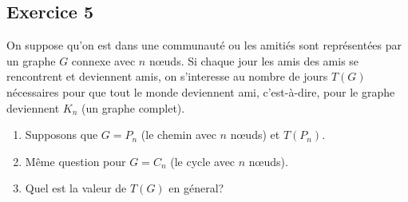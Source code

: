 \subsection*{Exercice 5}
On suppose qu'on est dans une communaut\'{e} ou les amiti\'{e}s sont repr\'{e}sent\'{e}es par un graphe $G$ connexe avec $n$ n\oe{}uds.
Si chaque jour les amis des amis se rencontrent et deviennent amis, on s'interesse au nombre de jours $T(G)$ n\'{e}cessaires
pour que tout le monde deviennent ami, c'est-\`{a}-dire, pour le graphe deviennent $K_n$ (un graphe complet).
\begin{enumerate}
\item Supposons que $G = P_n$ (le chemin avec $n$ n\oe{}uds) et $T(P_n)$.
\item M\^{e}me question pour $G = C_n$ (le cycle avec $n$ n\oe{}uds).
\item Quel est la valeur de $T(G)$ en g\'{e}neral?
\end{enumerate}


